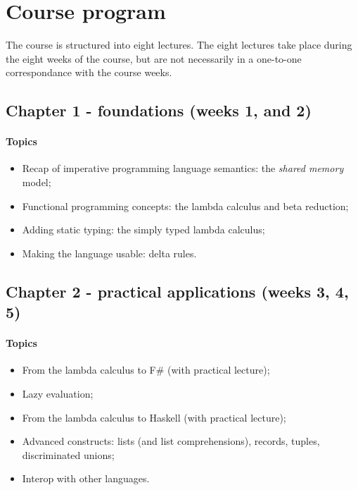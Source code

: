\section{Course program}
The course is structured into eight lectures.
The eight lectures take place during the eight weeks of the course, but are not necessarily in a one-to-one correspondance with the course weeks.

\subsection{Chapter 1 - foundations (weeks 1, and 2)}
\paragraph*{Topics}
\begin{itemize}
	\item Recap of imperative programming language semantics: the \textit{shared memory} model;
	\item Functional programming concepts: the lambda calculus and beta reduction;
	\item Adding static typing: the simply typed lambda calculus;
	\item Making the language usable: delta rules.
\end{itemize}

\subsection{Chapter 2 - practical applications (weeks 3, 4, 5)}
\paragraph*{Topics}			
\begin{itemize}
	\item From the lambda calculus to F\# (with practical lecture);
	\item Lazy evaluation;
	\item From the lambda calculus to Haskell (with practical lecture);
	\item Advanced constructs: lists (and list comprehensions), records, tuples, discriminated unions;
	\item Interop with other languages.
\end{itemize}
